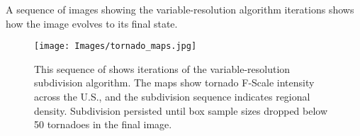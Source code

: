 A sequence of images showing the variable-resolution algorithm iterations shows how the image evolves to its final state.

        \begin{figure}[H]
      	\centering      
      	\texttt{[image: Images/tornado\_maps.jpg]}
      	\caption{This sequence of shows iterations of the variable-resolution subdivision algorithm. The maps show tornado F-Scale intensity across the U.S., and the subdivision sequence indicates regional density. Subdivision persisted until box sample sizes dropped below 50 tornadoes in the final image.}
        \end{figure}




% 
% 
% 
% 